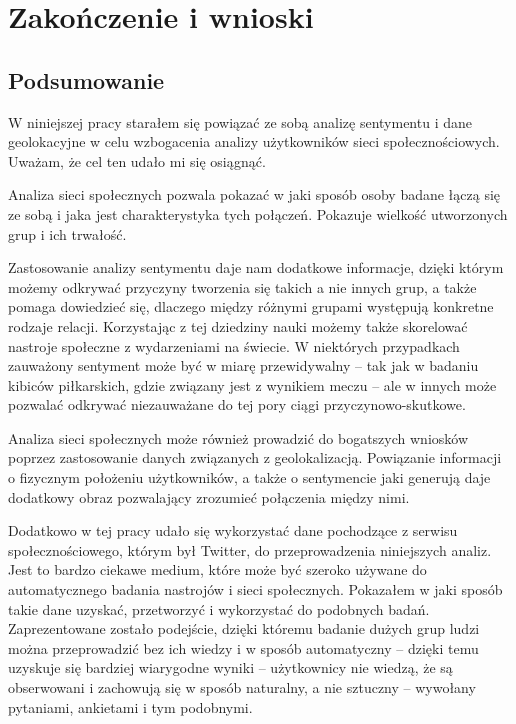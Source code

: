 \chapter{Zakończenie i wnioski}
\section{Podsumowanie}

W niniejszej pracy starałem się powiązać ze sobą analizę sentymentu i dane
geolokacyjne w celu wzbogacenia analizy użytkowników sieci społecznościowych.
Uważam, że cel ten udało mi się osiągnąć.

Analiza sieci społecznych pozwala pokazać w jaki sposób osoby badane łączą się
ze sobą i jaka jest charakterystyka tych połączeń. Pokazuje wielkość
utworzonych grup i ich trwałość.

Zastosowanie analizy sentymentu daje nam dodatkowe informacje, dzięki którym
możemy odkrywać przyczyny tworzenia się takich a nie innych grup,
a także pomaga dowiedzieć się, dlaczego między różnymi grupami występują
konkretne rodzaje relacji. Korzystając z tej dziedziny nauki możemy także
skorelować nastroje społeczne z wydarzeniami na świecie. W niektórych przypadkach
zauważony sentyment może być w miarę przewidywalny -- tak jak w badaniu 
kibiców piłkarskich, gdzie związany jest z wynikiem meczu -- ale w innych
może pozwalać odkrywać niezauważane do tej pory ciągi przyczynowo-skutkowe.

Analiza sieci społecznych może również prowadzić do bogatszych wniosków
poprzez zastosowanie danych związanych z geolokalizacją. Powiązanie informacji
o fizycznym położeniu użytkowników, a także o sentymencie jaki generują
daje dodatkowy obraz pozwalający zrozumieć połączenia między nimi.

Dodatkowo w tej pracy udało się wykorzystać dane pochodzące z serwisu 
społecznościowego, którym był Twitter, do przeprowadzenia niniejszych analiz.
Jest to bardzo ciekawe medium, które może być szeroko używane do automatycznego
badania nastrojów i sieci społecznych. Pokazałem w jaki sposób takie dane uzyskać,
przetworzyć i wykorzystać do podobnych badań. Zaprezentowane zostało podejście,
dzięki któremu badanie dużych grup ludzi można przeprowadzić bez ich wiedzy
i w sposób automatyczny -- dzięki temu uzyskuje się bardziej wiarygodne wyniki
-- użytkownicy nie wiedzą, że są obserwowani i zachowują się w sposób naturalny,
a nie sztuczny -- wywołany pytaniami, ankietami i tym podobnymi.


